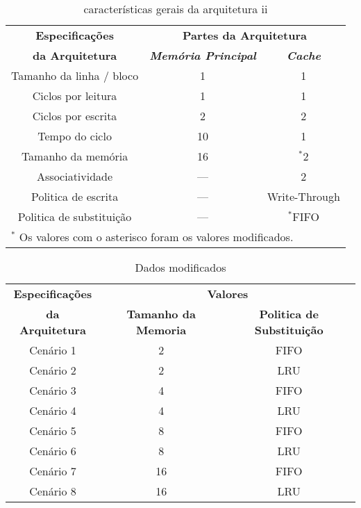     \begin{table}[!t]
    \caption{características gerais da arquitetura ii}
    \centering
        \begin{tabular}{|c|c|c|}
            \hline
            \textbf{Especificações} & \multicolumn{2}{|c|}{\textbf{Partes da Arquitetura}} \\
            \cline{2-3} 
            \textbf{da Arquitetura} & \textbf{\textit{Memória Principal}}& \textbf{\textit{Cache}} \\
            \hline
            Tamanho da linha / bloco & 1 & 1  \\
            \hline
            Ciclos por leitura & 1 & 1  \\
            \hline
            Ciclos por escrita & 2 & 2  \\
            \hline
            Tempo do ciclo & 10 & 1  \\
            \hline
            Tamanho da memória & 16 & {$^{\mathrm{*}}$}2  \\
            \hline
            Associatividade & --- & 2  \\
            \hline
            Politica de escrita & --- & Write-Through  \\
            \hline
            Politica de substituição & --- & {$^{\mathrm{*}}$}FIFO  \\
            \hline
            \multicolumn{3}{l}{$^{\mathrm{*}}$ Os valores com o asterisco foram os valores modificados.}
        \end{tabular}
        \label{tab2}
    \end{table}

    \begin{table}[!t]
    \caption{Dados modificados}
    \centering
        \begin{tabular}{|c|c|c|}
            \hline
            \textbf{Especificações} & \multicolumn{2}{|c|}{\textbf{Valores}} \\
            \cline{2-3} 
            \textbf{da Arquitetura} & \textbf{Tamanho da Memoria} & \textbf{Politica de Substituição} \\
            \hline
            Cenário 1 & 2 & FIFO \\
            \hline
            Cenário 2 & 2 & LRU \\
            \hline
            Cenário 3 & 4 & FIFO\\
            \hline
            Cenário 4 & 4 & LRU\\
            \hline
            Cenário 5 & 8 & FIFO\\
            \hline
            Cenário 6 & 8 & LRU\\
            \hline
            Cenário 7 & 16 & FIFO\\
            \hline
            Cenário 8 & 16 & LRU\\
            \hline
        \end{tabular}
        \label{tab3}
    \end{table}

